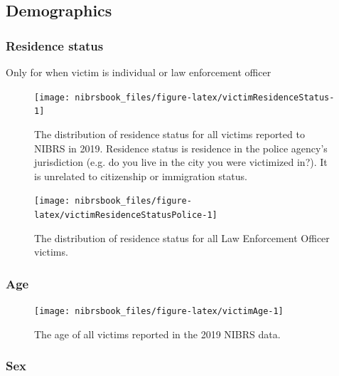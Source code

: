 \documentclass[
  12pt,
  openany]{book}
\begin{document}
\hypertarget{demographics-1}{%
\subsection{Demographics}\label{demographics-1}}

\hypertarget{residence-status}{%
\subsubsection{Residence status}\label{residence-status}}

Only for when victim is individual or law enforcement officer

\begin{figure}

{\centering \texttt{[image: nibrsbook\_files/figure-latex/victimResidenceStatus-1]} 

}

\caption{The distribution of residence status for all victims reported to NIBRS in 2019. Residence status is residence in the police agency's jurisdiction (e.g. do you live in the city you were victimized in?). It is unrelated to citizenship or immigration status.}\label{fig:victimResidenceStatus}
\end{figure}

\begin{figure}

{\centering \texttt{[image: nibrsbook\_files/figure-latex/victimResidenceStatusPolice-1]} 

}

\caption{The distribution of residence status for all Law Enforcement Officer victims.}\label{fig:victimResidenceStatusPolice}
\end{figure}

\hypertarget{age-1}{%
\subsubsection{Age}\label{age-1}}

\begin{figure}

{\centering \texttt{[image: nibrsbook\_files/figure-latex/victimAge-1]} 

}

\caption{The age of all victims reported in the 2019 NIBRS data.}\label{fig:victimAge}
\end{figure}

\hypertarget{sex-1}{%
\subsubsection{Sex}\label{sex-1}}
\end{document}
